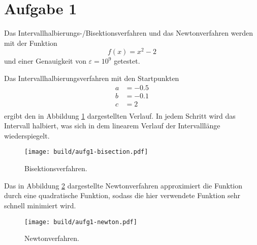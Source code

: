 \section*{Aufgabe 1}
Das Intervallhalbierungs-/Bisektionsverfahren und das Newtonverfahren werden
mit der Funktion
\begin{equation*}
  f\!\left(x\right) = x^2 - 2
\end{equation*}
und einer Genauigkeit von $\varepsilon = 10^9$ getestet.

Das Intervallhalbierungsverfahren mit den Startpunkten
\begin{align*}
  a &= \num{-0.5} \\
  b &= \num{-0.1} \\
  c &= \num{2} \\
\end{align*}
ergibt den in Abbildung \ref{fig:A1-Bisektionsverfahren} dargestellten Verlauf.
In jedem Schritt wird das Intervall halbiert, was sich in dem linearem Verlauf
der Intervalllänge wiederspiegelt.
\begin{figure}
  \centering
  \texttt{[image: build/aufg1-bisection.pdf]}
  \caption{Bisektionsverfahren.}
  \label{fig:A1-Bisektionsverfahren}
\end{figure}
Das in Abbildung \ref{fig:A1-Newtonverfahren} dargestellte Newtonverfahren approximiert
die Funktion durch eine quadratische Funktion,
sodass die hier verwendete Funktion sehr schnell minimiert wird.
\begin{figure}
  \centering
  \texttt{[image: build/aufg1-newton.pdf]}
  \caption{Newtonverfahren.}
  \label{fig:A1-Newtonverfahren}
\end{figure}
